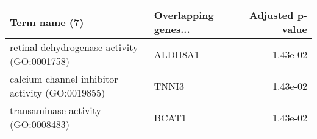 \begin{tabular}{llr}
\toprule
                                  Term name (7) & Overlapping genes... &  Adjusted p-value \\
\midrule
    retinal dehydrogenase activity (GO:0001758) &              ALDH8A1 &          1.43e-02 \\
calcium channel inhibitor activity (GO:0019855) &                TNNI3 &          1.43e-02 \\
             transaminase activity (GO:0008483) &                BCAT1 &          1.43e-02 \\
\bottomrule
\end{tabular}
